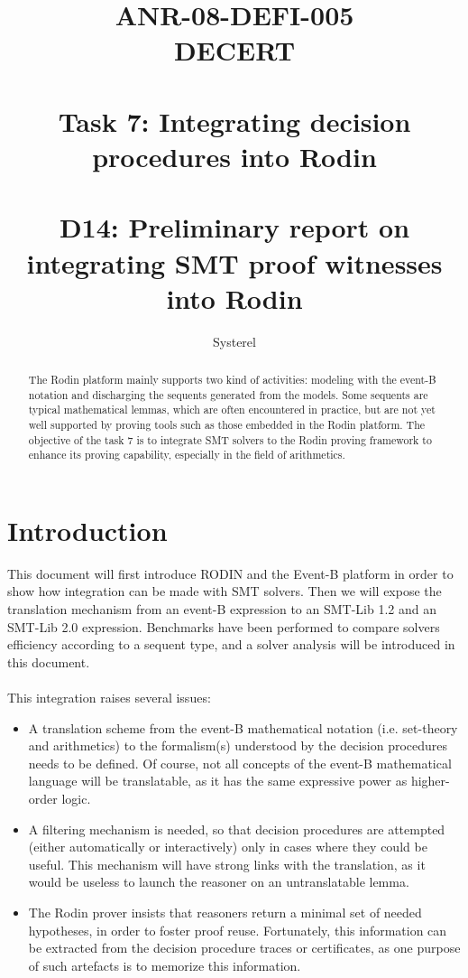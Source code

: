 \documentclass[10pt,a4paper]{report}
\title{ANR-08-DEFI-005 \\ DECERT \\ ~ \\ Task 7: Integrating decision procedures into Rodin \\ ~ \\ D14: Preliminary report on integrating SMT proof witnesses into Rodin}
\author{Systerel}
\begin{document}
\maketitle

\begin{abstract}

The Rodin platform \cite{RODIN} mainly supports two kind of activities: modeling with the event-B notation and discharging the sequents generated from the models. 
Some sequents are typical mathematical lemmas, which are often encountered in practice, but are not yet well supported by proving tools such as those embedded in the Rodin platform.
The objective of the task 7 is to integrate SMT solvers to the Rodin proving framework to enhance its proving capability, especially in the field of arithmetics.

\end{abstract}

\tableofcontents

\section{Introduction}
This document will first introduce RODIN and the Event-B platform in order to show how integration can be made with SMT solvers. Then we will expose the translation mechanism from an event-B expression to an SMT-Lib 1.2 and an SMT-Lib 2.0 expression. Benchmarks have been performed to compare solvers efficiency according to a sequent type, and a solver analysis will be introduced in this document.  

\paragraph{}
This integration raises several issues:
\begin{itemize}
\item A translation scheme from the event-B mathematical notation (i.e. set-theory and arithmetics) to the formalism(s) understood by the decision procedures needs to be defined. Of course, not all
concepts of the event-B mathematical language will be translatable, as it has the same expressive
power as higher-order logic.
\item A filtering mechanism is needed, so that decision procedures are attempted (either automatically or interactively) only in cases where they could be useful. This mechanism will have strong links with the translation, as it would be useless to launch the reasoner on an untranslatable lemma.
\item The Rodin prover insists that reasoners return a minimal set of needed hypotheses, in order to foster proof reuse. Fortunately, this information can be extracted from the decision procedure
traces or certificates, as one purpose of such artefacts is to memorize this information.
\end{itemize}
\end{document}

